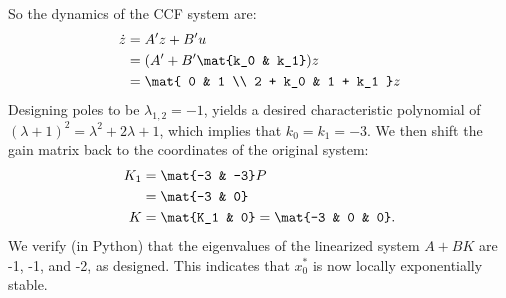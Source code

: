 \documentclass{homework}
\begin{document}
\begin{letterenum}
So the dynamics of the CCF system are:
\begin{align*}
    \dot{z} &= A'z + B'u \\
        &= (A' + B'\mat{k_0 & k_1}) z \\
        &= \mat{
            0 & 1 \\
            2 + k_0 & 1 + k_1
        } z
\end{align*}
Designing poles to be $\lambda_{1,2} = -1$, yields a desired characteristic
polynomial of $(\lambda+1)^2 = \lambda^2 + 2\lambda + 1$, which implies that
$k_0 = k_1 = -3$. We then shift the gain matrix back to the coordinates of the
original system:
\begin{align*}
    K_1 &= \mat{-3 & -3} P \\
        &= \mat{-3 & 0} \\
    K &= \mat{K_1 & 0} = \mat{-3 & 0 & 0}.
\end{align*}
We verify (in Python) that the eigenvalues of the linearized system $A + BK$ 
are -1, -1, and -2, as designed. This indicates that $x_0^*$ is now locally
exponentially stable.

\end{letterenum}
\end{document}
